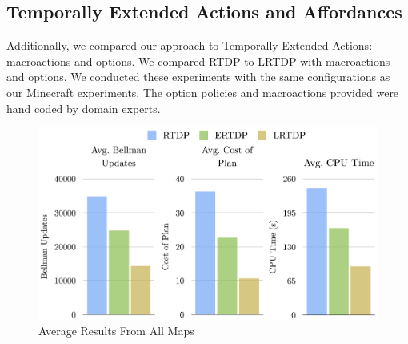\documentclass[letterpaper]{article}
\begin{document}


\subsection{Temporally Extended Actions and Affordances}
Additionally, we compared our approach to Temporally Extended Actions: 
macroactions and options. We compared RTDP  to LRTDP with 
macroactions and options. We conducted these experiments 
with the same configurations as our Minecraft experiments. The option policies
and macroactions provided were hand coded by domain experts.

\begin{figure}[t]
\centering
\includegraphics[scale=0.25]{figures/average_results.png}%
  \caption{Average Results From All Maps}
  \label{fig:average_results}
\end{figure}
\end{document}
